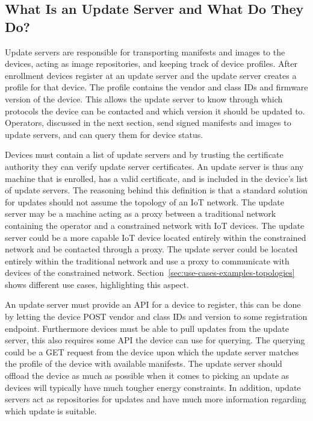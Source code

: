 \documentclass[0-thesis.tex]{subfiles}
\begin{document}
\subsection{What Is an Update Server and What Do They Do?}
\label{ssec:what-is-an-update-server}
Update servers are responsible for transporting manifests and images to the devices,
acting as image repositories, and keeping track of device profiles. After enrollment
devices register at an update server and the update server creates a profile for that
device. The profile contains the vendor and class IDs and firmware version of the device.
This allows the update server to know through which protocols the device can be contacted
and which version it should be updated to. Operators, discussed in the next section, send
signed manifests and images to update servers, and can query them for device status.

Devices must contain a list of update servers and by trusting the certificate authority
they can verify update server certificates. An update server is thus any machine that is
enrolled, has a valid certificate, and is included in the device's list of update servers.
The reasoning behind this definition is that a standard solution for updates should not
assume the topology of an IoT network. The update server may be a machine acting as a
proxy between a traditional network containing the operator and a constrained network with
IoT devices. The update server could be a more capable IoT device located entirely within
the constrained network and be contacted through a proxy. The update server could be
located entirely within the traditional network and use a proxy to communicate with
devices of the constrained network. Section~\ref{sec:use-cases-examples-topologies} shows
different use cases, highlighting this aspect.

An update server must provide an API for a device to register, this can be done by letting
the device POST vendor and class IDs and version to some registration endpoint.
Furthermore devices must be able to pull updates from the update server, this also
requires some API the device can use for querying. The querying could be a GET request
from the device upon which the update server matches the profile of the device with
available manifests. The update server should offload the device as much as possible when
it comes to picking an update as devices will typically have much tougher energy
constraints. In addition, update servers act as repositories for updates and have much
more information regarding which update is suitable.
\end{document}
